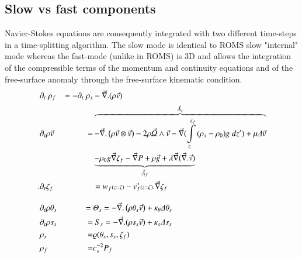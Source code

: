 \documentclass[a4paper,12pt]{article}
\begin{document}
 \subsection{Slow vs fast components}
\indent Navier-Stokes equations are consequently integrated with two different time-steps in a time-splitting algorithm. The slow mode is identical to ROMS slow "internal" mode whereas the fast-mode (unlike in ROMS) is 3D and allows the integration of the compressible terms of the momentum and continuity equations and of the free-surface anomaly through the free-surface kinematic condition.
\begin{equation}
  \begin{split}
    \displaystyle
   &\partial_t\ \rho_f &= -\partial_t\ \rho_{s}
   &-\vec{\nabla}.(\rho\vec{v})\\
   &\partial_t\rho\vec{v} &= 
   & \overbrace{-\vec{\nabla}.\left(\rho\vec{v}\otimes\vec{v}\right)
   -2\rho\vec{\Omega}\wedge\vec{v}
   -\vec\nabla(\int\limits_z^{\zeta_f}{(\rho_{s}-\rho_0)g\ dz'})
   +\mu\Delta\vec{v}}^{\vec{\Lambda}_{s}}\\
   & & &\underbrace{-\rho_{0}g\vec\nabla\zeta_f
   -\vec\nabla{P}
   +\rho\vec{g}
   +\lambda\vec{\nabla}(\vec{\nabla}.\vec{v})}_{\vec{\Lambda}_{f}}\\
.   &\partial_t{\zeta_f} &&= 
   w_f\scriptstyle(z=\zeta)\textstyle
   -\vec{v_f}\scriptstyle(z=\zeta)\textstyle.\vec{\nabla}{\zeta_f}\\[3mm]
   &\partial_t{\rho\theta_s} &=\ &\Theta_{s}=-\vec{\nabla}.\left(\rho\theta_s\vec{v}\right)
   +\kappa_{\theta}\Delta\theta_s\\
   &\partial_t{\rho s_s} &= &\ S_{s}= -\vec{\nabla}.(\rho s_s\vec{v})
   +\kappa_{s}\Delta{s_s}\\
   &\rho_s &= &\varrho(\theta_s,s_s,\zeta_f)\\
   &\rho_f &= &c_s^{-2} P_f
  \end{split}
\end{equation}
  
\end{document}
